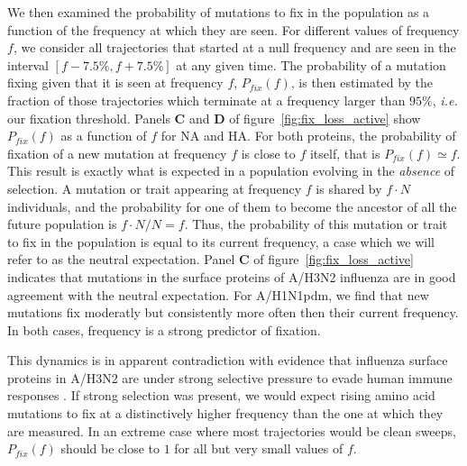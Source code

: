 \documentclass[reprint,amsmath,amssymb,superscriptaddress,showpacs,rmp]{revtex4-1}
\begin{document}
We then examined the probability of mutations to fix in the population as a function of the frequency at which they are seen.
For different values of frequency $f$, we consider all trajectories that started at a null frequency and are seen in the interval $[f - 7.5\%, f + 7.5\%]$ at any given time.
The probability of a mutation fixing given that it is seen at frequency $f$, $P_{fix}(f)$, is then estimated by the fraction of those trajectories which terminate at a frequency larger than $95\%$, \emph{i.e.} our fixation threshold.
Panels \textbf{C} and \textbf{D} of figure~\ref{fig:fix_loss_active} show $P_{fix}(f)$ as a function of $f$ for NA and HA.
For both proteins, the probability of fixation of a new mutation at frequency $f$ is close to $f$ itself, that is $P_{fix}(f)\simeq f$.
This result is exactly what is expected in a population evolving in the \emph{absence} of selection.
A mutation or trait appearing at frequency $f$ is shared by $f\cdot N$ individuals, and the probability for one of them to become the ancestor of all the future population is $f\cdot N/N=f$.
Thus, the probability of this mutation or trait to fix in the population is equal to its current frequency, a case which we will refer to as the neutral expectation.
Panel \textbf{C} of figure~\ref{fig:fix_loss_active} indicates that mutations in the surface proteins of A/H3N2 influenza are in good agreement with the neutral expectation.
For A/H1N1pdm, we find that new mutations fix moderatly but consistently more often then their current frequency.
In both cases, frequency is a strong predictor of fixation.

This dynamics is in apparent contradiction with evidence that influenza surface proteins in A/H3N2 are under strong selective pressure to evade human immune responses \citep{bhatt_genomic_2011}.
If strong selection was present, we would expect rising amino acid mutations to fix at a distinctively higher frequency than the one at which they are measured.
In an extreme case where most trajectories would be clean sweeps, $P_{fix}(f)$ should be close to $1$ for all but very small values of $f$.
\end{document}
